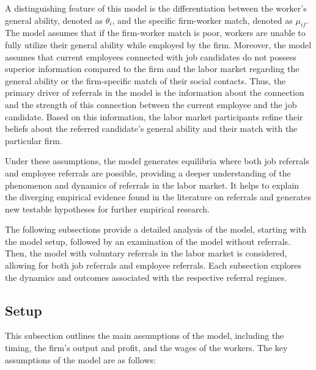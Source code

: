 \documentclass[12pt]{article}
\begin{document}
A distinguishing feature of this model is the differentiation between the worker's general ability, denoted as $\theta_i$, and the specific firm-worker match, denoted as $\mu_{if}$. The model assumes that if the firm-worker match is poor, workers are unable to fully utilize their general ability while employed by the firm. Moreover, the model assumes that current employees connected with job candidates do not possess superior information compared to the firm and the labor market regarding the general ability or the firm-specific match of their social contacts. Thus, the primary driver of referrals in the model is the information about the connection and the strength of this connection between the current employee and the job candidate. Based on this information, the labor market participants refine their beliefs about the referred candidate's general ability and their match with the particular firm.

Under these assumptions, the model generates equilibria where both job referrals and employee referrals are possible, providing a deeper understanding of the phenomenon and dynamics of referrals in the labor market. It helps to explain the diverging empirical evidence found in the literature on referrals and generates new testable hypotheses for further empirical research.

The following subsections provide a detailed analysis of the model, starting with the model setup, followed by an examination of the model without referrals. Then, the model with voluntary referrals in the labor market is considered, allowing for both job referrals and employee referrals. Each subsection explores the dynamics and outcomes associated with the respective referral regimes.

\subsection{Setup}
This subsection outlines the main assumptions of the model, including the timing, the firm's output and profit, and the wages of the workers. The key assumptions of the model are as follows:
\end{document}
